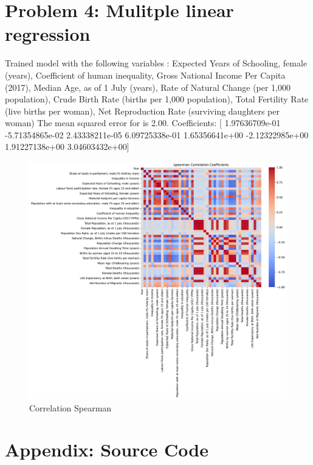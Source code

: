 \documentclass[a4paper]{article}
\begin{document}
\section*{Problem 4: Mulitple linear regression}


Trained model with the following variables :  
Expected Years of Schooling, female (years), Coefficient of human inequality, Gross National Income Per Capita (2017), Median Age, as of 1 July (years), Rate of Natural Change (per 1,000 population), Crude Birth Rate (births per 1,000 population), Total Fertility Rate (live births per woman), Net Reproduction Rate (surviving daughters per woman)
The mean squared error for is 2.00.
Coefficients:  [ 1.97636709e-01 -5.71354865e-02  2.43338211e-05  6.09725338e-01
  1.65356641e+00 -2.12322985e+00  1.91227138e+00  3.04603432e+00]

\begin{figure}[h]
  \begin{center}
    \includegraphics[width=\textwidth]{ola/spearman_correlation.pdf}
    \caption{Correlation Spearman}
    \label{fig:spearman_correlation}
  \end{center}
\end{figure}



\newpage


\printbibliography

\section*{Appendix: Source Code}




\end{document}
